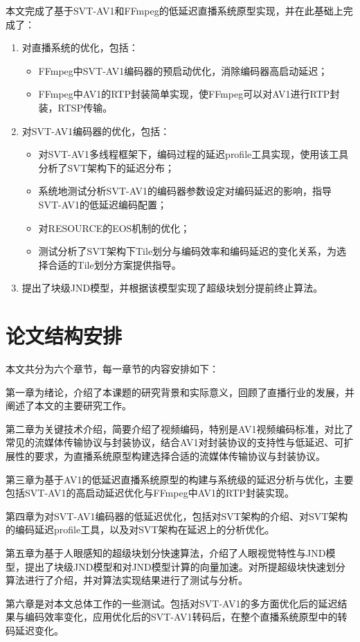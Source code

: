 本文完成了基于SVT-AV1和FFmpeg的低延迟直播系统原型实现，并在此基础上完成了：
\begin{enumerate} [label=\arabic*)]
    \item 对直播系统的优化，包括：
        \begin{itemize}
            \item FFmpeg中SVT-AV1编码器的预启动优化，消除编码器高启动延迟；
            \item FFmpeg中AV1的RTP封装简单实现，使FFmpeg可以对AV1进行RTP封装，RTSP传输。
        \end{itemize}
    \item 对SVT-AV1编码器的优化，包括：
        \begin{itemize}
            \item 对SVT-AV1多线程框架下，编码过程的延迟profile工具实现，使用该工具分析了SVT架构下的延迟分布；
            \item 系统地测试分析SVT-AV1的编码器参数设定对编码延迟的影响，指导SVT-AV1的低延迟编码配置；
            \item 对RESOURCE的EOS机制的优化；
            \item 测试分析了SVT架构下Tile划分与编码效率和编码延迟的变化关系，为选择合适的Tile划分方案提供指导。
        \end{itemize}
    \item 提出了块级JND模型，并根据该模型实现了超级块划分提前终止算法。
\end{enumerate}

\section{论文结构安排}

本文共分为六个章节，每一章节的内容安排如下：

第一章为绪论，介绍了本课题的研究背景和实际意义，回顾了直播行业的发展，并阐述了本文的主要研究工作。

第二章为关键技术介绍，简要介绍了视频编码，特别是AV1视频编码标准，对比了常见的流媒体传输协议与封装协议，结合AV1对封装协议的支持性与低延迟、可扩展性的要求，为直播系统原型构建选择合适的流媒体传输协议与封装协议。

第三章为基于AV1的低延迟直播系统原型的构建与系统级的延迟分析与优化，主要包括SVT-AV1的高启动延迟优化与FFmpeg中AV1的RTP封装实现。

第四章为对SVT-AV1编码器的低延迟优化，包括对SVT架构的介绍、对SVT架构的编码延迟profile工具，以及对SVT架构在延迟上的分析优化。

第五章为基于人眼感知的超级块划分快速算法，介绍了人眼视觉特性与JND模型，提出了块级JND模型和对JND模型计算的向量加速。对所提超级块快速划分算法进行了介绍，并对算法实现结果进行了测试与分析。

第六章是对本文总体工作的一些测试。包括对SVT-AV1的多方面优化后的延迟结果与编码效率变化，应用优化后的SVT-AV1转码后，在整个直播系统原型中的转码延迟变化。